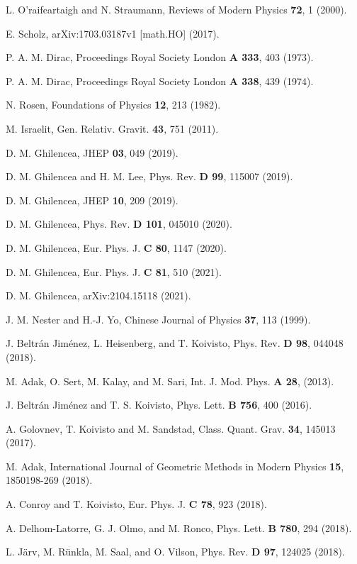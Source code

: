 \documentclass[aps,superscriptaddress, showpacs,preprintnumbers, superscriptaddress, nofootinbibt,twocolumn]{revtex4}
\begin{document}
\begin{thebibliography}{99}
 L. O'raifeartaigh and N. Straumann, Reviews of Modern Physics {\bf 72},  1 (2000).

 E. Scholz, arXiv:1703.03187v1 [math.HO] (2017).

 P. A. M. Dirac, Proceedings Royal Society London {\bf A 333}, 403 (1973).

 P. A. M. Dirac, Proceedings Royal Society London {\bf A 338}, 439 (1974).

 N. Rosen, Foundations of Physics {\bf 12}, 213 (1982).

 M. Israelit, Gen. Relativ. Gravit. {\bf 43}, 751 (2011).

 D. M. Ghilencea, JHEP {\bf 03},  049 (2019).

 D. M. Ghilencea and H. M. Lee, Phys. Rev. {\bf D 99}, 115007 (2019).

 D. M. Ghilencea, JHEP {\bf 10}, 209 (2019).

 D. M. Ghilencea, Phys. Rev. {\bf D 101}, 045010 (2020).

 D. M. Ghilencea, Eur. Phys. J. {\bf C 80}, 1147 (2020).

 D. M. Ghilencea, Eur. Phys. J. {\bf C 81}, 510 (2021).

 D. M. Ghilencea, arXiv:2104.15118 (2021).

 J. M. Nester and H.-J. Yo, Chinese Journal of Physics
{\bf 37}, 113 (1999).

  J. Beltr\'{a}n Jim\'{e}nez, L. Heisenberg, and T. Koivisto,
Phys. Rev. {\bf D 98}, 044048 (2018).

  M. Adak, O. Sert, M. Kalay, and M. Sari, Int. J.  Mod. Phys. {\bf A 28}, (2013).

 J. Beltr\'{a}n Jim\'{e}nez and T. S. Koivisto, Phys. Lett. {\bf B
756}, 400 (2016).

  A. Golovnev, T. Koivisto and M. Sandstad, Class.
Quant. Grav. {\bf 34}, 145013 (2017).

 M. Adak, International Journal of Geometric Methods
in Modern Physics {\bf 15}, 1850198-269 (2018).

 A. Conroy and T. Koivisto, Eur. Phys. J. {\bf C 78}, 923
(2018).

 A. Delhom-Latorre, G. J. Olmo, and M. Ronco, Phys.
Lett. {\bf B 780}, 294 (2018).

 L. J\"{a}rv, M. R\"{u}nkla, M. Saal, and O. Vilson, Phys. Rev.
{\bf D 97}, 124025 (2018).


\end{thebibliography}
\end{document}
